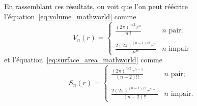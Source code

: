 En rassemblant ces résultats, on voit que l'on peut réécrire l'équation~\eqref{eq:volume_mathworld} comme
\begin{equation}
\label{eq:volume_2pi}
V_n(r) = \begin{cases}
 \displaystyle \frac{(2\pi)^{n/2}\,r^n}{n!!} & n \text{ pair}; \\ \\
 \displaystyle \frac{2(2\pi)^{(n-1)/2}\,r^n}{n!!} & n \text{ impair}
 \end{cases}
\end{equation}
et l'équation~\eqref{eq:surface_area_mathworld} comme
\begin{equation}
\label{eq:surface_area_2pi}
S_n(r) = \begin{cases}
\displaystyle \frac{(2\pi)^{n/2}\,r^{n-1}}{(n-2)!!} & n \text{ pair}; \\ \\
\displaystyle \frac{2(2\pi)^{(n-1)/2}\,r^{n-1}}{(n-2)!!} & n \text{ impair}.
\end{cases}
\end{equation}

